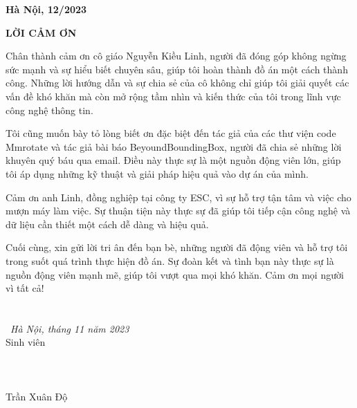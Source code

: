\documentclass[12pt,a4paper,openany,oneside]{report}
\begin{document}
\vfill
\begin{center}
	{{\bf Hà Nội, 12/2023}}
\end{center}


\newpage
\restoregeometry
 \pagestyle{fancy}
 \fontsize{13pt}{13pt}\selectfont \baselineskip 0.75cm 

\tableofcontents

\newpage
\begin{center}
	\Large{\textbf{LỜI CẢM ƠN}}\\
\end{center}
\vspace{1cm}
Chân thành cảm ơn cô giáo Nguyễn Kiều Linh, người đã đóng góp không ngừng sức mạnh và sự hiểu biết chuyên sâu, giúp tôi hoàn thành đồ án một cách thành công. Những lời hướng dẫn và sự chia sẻ của cô không chỉ giúp tôi giải quyết các vấn đề khó khăn mà còn mở rộng tầm nhìn và kiến thức của tôi trong lĩnh vực công nghệ thông tin.

Tôi cũng muốn bày tỏ lòng biết ơn đặc biệt đến tác giả của các thư viện code Mmrotate và tác giả bài báo BeyoundBoundingBox, người đã chia sẻ những lời khuyên quý báu qua email. Điều này thực sự là một nguồn động viên lớn, giúp tôi áp dụng những kỹ thuật và giải pháp hiệu quả vào dự án của mình.

Cảm ơn anh Linh, đồng nghiệp tại công ty ESC, vì sự hỗ trợ tận tâm và việc cho mượn máy làm việc. Sự thuận tiện này thực sự đã giúp tôi tiếp cận công nghệ và dữ liệu cần thiết một cách dễ dàng và hiệu quả.

Cuối cùng, xin gửi lời tri ân đến bạn bè, những người đã động viên và hỗ trợ tôi trong suốt quá trình thực hiện đồ án. Sự đoàn kết và tình bạn này thực sự là nguồn động viên mạnh mẽ, giúp tôi vượt qua mọi khó khăn. Cảm ơn mọi người vì tất cả!
\
 \\
 
 \
  \\
 \
  \\
 
\phantom{nnnnnnnnnnnnnnnnnnnnnnnnnnnnnnn}\  {\textit{Hà Nội, tháng 11  năm 2023}} \\
\phantom{nnnnnnnnnnnnnnnnnnnnnnnnnnnnnnnnnnnnnnnnn} {Sinh viên}\\
\phantom{nnnnnnnnnnnnnnnnnnnnnnnnnnnnnnnnnn} \\
\phantom{nnnnnnnnnnnnnnnnnnnnnnnnnnnnnnnnnn} \\ 
\phantom{nnnnnnnnnnnnnnnnnnnnnnnnnnnnnnnnnn} \\ 
\phantom{nnnnnnnnnnnnnnnnnnnnnnnnnnnnnnnnnnnnnnn}   {Trần Xuân Độ}
\end{document}

